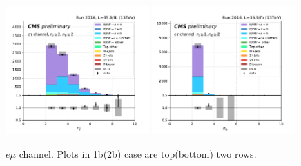 \begin{figure}[ht]
    \includegraphics[width=0.49\textwidth]{chapters/Appendix/sectionPlots/figures/kinematics_pickles/etau/2b/etau_2b_nJets.pdf}
    \includegraphics[width=0.49\textwidth]{chapters/Appendix/sectionPlots/figures/kinematics_pickles/etau/2b/etau_2b_nBJets.pdf}
    
    \caption{$e\mu$ channel. Plots in 1b(2b) case are top(bottom) two rows.}
\end{figure}


